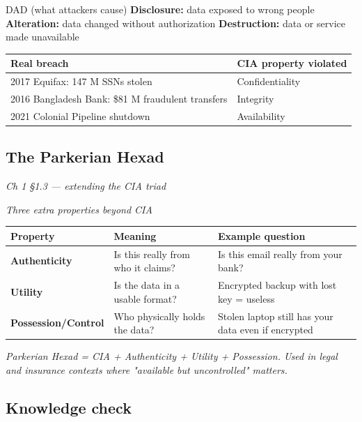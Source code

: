 \documentclass[12pt,openany]{book}
\begin{document}
DAD (what attackers cause)
\textbf{Disclosure:} data exposed to wrong people
\textbf{Alteration:} data changed without authorization
\textbf{Destruction:} data or service made unavailable

\begin{center}\small\begin{tabular}{p{6.5cm}p{6.5cm}}\toprule
\textbf{Real breach} & \textbf{CIA property violated} \\ \midrule
2017 Equifax: 147 M SSNs stolen & Confidentiality \\
2016 Bangladesh Bank: \$81 M fraudulent transfers & Integrity \\
2021 Colonial Pipeline shutdown & Availability \\
\bottomrule\end{tabular}\end{center}

\medskip

\subsection*{The Parkerian Hexad}
{\small\itshape\color{gray}Ch 1 §1.3 --- extending the CIA triad}

{\small\itshape\color{gray}Three extra properties beyond CIA}

\begin{center}\small\begin{tabular}{p{4.3cm}p{4.3cm}p{4.3cm}}\toprule
\textbf{Property} & \textbf{Meaning} & \textbf{Example question} \\ \midrule
\textbf{Authenticity} & Is this really from who it claims? & Is this email really from your bank? \\
\textbf{Utility} & Is the data in a usable format? & Encrypted backup with lost key = useless \\
\textbf{Possession/Control} & Who physically holds the data? & Stolen laptop still has your data even if encrypted \\
\bottomrule\end{tabular}\end{center}

{\small\itshape\color{gray}Parkerian Hexad = CIA + Authenticity + Utility + Possession. Used in legal and insurance contexts where "available but uncontrolled" matters.}

\medskip

\subsection*{Knowledge check}
\end{document}
